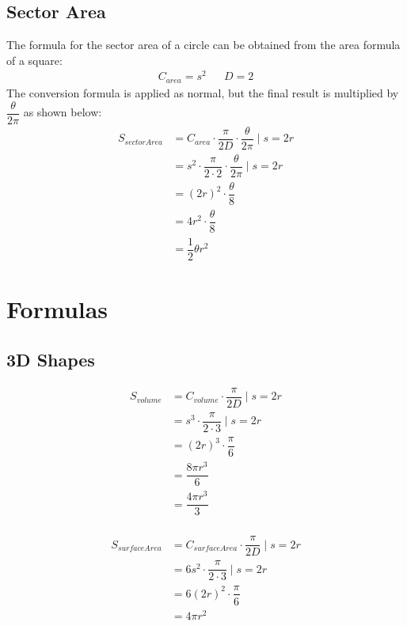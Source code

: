 \documentclass[12pt,letterpaper,twocolumn]{article}
\begin{document}
\subsection*{Sector Area}
The formula for the sector area of a circle can be obtained from the area formula of a square:
	\begin{align}
		C_{area} = s^{2} && D =  2
	\end{align}	
The conversion formula is applied as normal, but the final result is multiplied by $\dfrac{\theta}{2\pi}$ as shown below:
	\begin{align*}
		S_{sectorArea} &= C_{area} \cdot\dfrac{\pi}{2D} \cdot \dfrac{\theta}{2\pi} \mid  s=2r \\
		&= s^{2} \cdot\dfrac{\pi}{2\cdot 2} \cdot \dfrac{\theta}{2\pi} \mid s=2r\\
		&= (2r)^2 \cdot\dfrac{\theta}{8} \\
		&= 4r^2 \cdot\dfrac{\theta}{8} \\
		&= \dfrac{1}{2} \theta r^2
	\end{align*}

\section*{Formulas}

\subsection*{3D Shapes}
	\begin{align*}
		S_{volume} &= C_{volume} \cdot\dfrac{\pi}{2D} \mid  s=2r \\
		&= s^{3} \cdot\dfrac{\pi}{2\cdot 3} \mid s=2r\\
		&= (2r)^{3} \cdot\dfrac{\pi}{6} \\
		&= \dfrac{8\pi r^{3}}{6} \\
		&= \dfrac{4\pi r^{3}}{3} \\
	\end{align*}
	
		\begin{align*}
		S_{surfaceArea} &= C_{surfaceArea} \cdot\dfrac{\pi}{2D} \mid  s=2r \\
		&= 6s^{2} \cdot\dfrac{\pi}{2\cdot 3} \mid s=2r\\
		&= 6(2r)^{2} \cdot\dfrac{\pi}{6} \\
		&= 4\pi r^{2}
	\end{align*}
\end{document}
